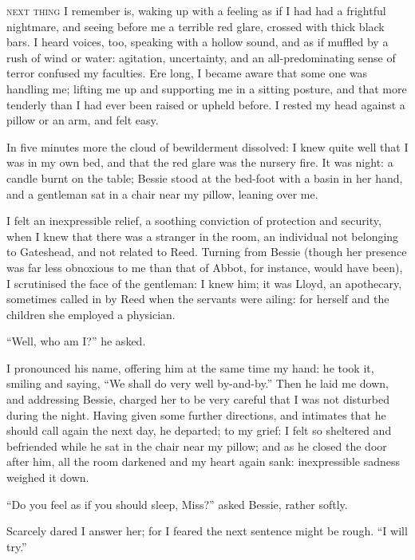 
 \textsc{next thing} I remember is, waking up with a feeling as if I had had a
frightful nightmare, and seeing before me a terrible red glare, crossed
with thick black bars.  I heard voices, too, speaking with a hollow
sound, and as if muffled by a rush of wind or water: agitation,
uncertainty, and an all-predominating sense of terror confused my
faculties.  Ere long, I became aware that some one was handling me;
lifting me up and supporting me in a sitting posture, and that more
tenderly than I had ever been raised or upheld before.  I rested my head
against a pillow or an arm, and felt easy.

In five minutes more the cloud of bewilderment dissolved: I knew quite
well that I was in my own bed, and that the red glare was the nursery
fire.  It was night: a candle burnt on the table; Bessie stood at the
bed-foot with a basin in her hand, and a gentleman sat in a chair near
my pillow, leaning over me.

I felt an inexpressible relief, a soothing conviction of protection and
security, when I knew that there was a stranger in the room, an
individual not belonging to Gateshead, and not related to \Mrs{} Reed. 
Turning from Bessie (though her presence was far less obnoxious to me
than that of Abbot, for instance, would have been), I scrutinised the
face of the gentleman: I knew him; it was \Mr{} Lloyd, an apothecary,
sometimes called in by \Mrs{} Reed when the servants were ailing: for
herself and the children she employed a physician.

\enquote{Well, who am I?} he asked.

I pronounced his name, offering him at the same time my hand: he took
it, smiling and saying, \enquote{We shall do very well by-and-by.}  Then
he laid me down, and addressing Bessie, charged her to be very careful
that I was not disturbed during the night.  Having given some further
directions, and intimates that he should call again the next day, he
departed; to my grief: I felt so sheltered and befriended while he sat
in the chair near my pillow; and as he closed the door after him, all
the room darkened and my heart again sank: inexpressible sadness weighed
it down.

\enquote{Do you feel as if you should sleep, Miss?} asked Bessie, rather
softly.

Scarcely dared I answer her; for I feared the next sentence might be
rough.  \enquote{I will try.}

